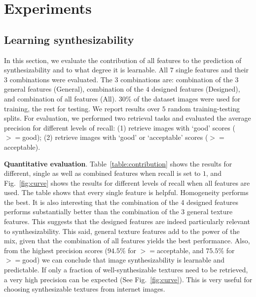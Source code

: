 
\section{Experiments}
\label{sec:experiment}

\subsection{Learning synthesizability}

In this section, we evaluate the contribution of all features to the
prediction of synthesizability and to what degree it is learnable.
All $7$ single features and their $3$ combinations were
evaluated. The $3$ combinations are: combination of the $3$
general features (General), combination of the $4$ designed features
(Designed), and combination of all features (All).  $30\%$ of the
dataset images were used for training, the rest for testing. We report
results over $5$ random training-testing splits. For evaluation, we
performed two retrieval tasks and evaluated the average precision for
different levels of recall: (1) retrieve images with `good' scores
($>=$good); (2) retrieve images with `good' or `acceptable' scores
($>=$acceptable).


\textbf{Quantitative evaluation}. Table~\ref{table:contribution} shows
the results for different, single as well as combined features when 
recall is set to $1$, and Fig.~\ref{fig:curve} shows the results for 
different levels of recall when all features are used. The table shows 
that every single feature is helpful. Homogeneity performs the best. 
It is also interesting that the combination of the 4 designed features 
performs substantially better than the combination of the 3 general 
texture features. This suggests that the designed features are indeed
particularly relevant to synthesizability. This said, general texture 
features add to the power of the mix, given that the combination of all 
features yields the best performance. Also, from the highest precision 
scores ($94.5\%$ for $>=$acceptable, and $75.5\%$ for $>=$good) we can 
conclude that image synthesizability is learnable and predictable. If 
only a fraction of well-synthesizable textures need to be retrieved, 
a very high precision can be expected (See Fig.~\ref{fig:curve}). This 
is very useful for choosing synthesizable textures from internet images. 


